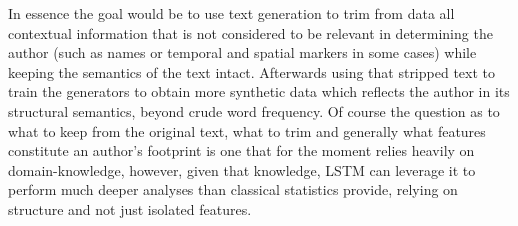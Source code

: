 In essence the goal would be to use text generation to trim from data all
contextual information that is not considered to be relevant in determining the
author (such as names or temporal and spatial markers in some cases) while
keeping the semantics of the text intact. Afterwards using that stripped text
to train the generators to obtain more synthetic data which reflects the author
in its structural semantics, beyond crude word frequency.  Of course the
question as to what to keep from the original text, what to trim and generally
what features constitute an author's footprint is one that for the moment
relies heavily on domain-knowledge, however, given that knowledge, LSTM can
leverage it to perform much deeper analyses than classical statistics provide,
relying on structure and not just isolated features.



